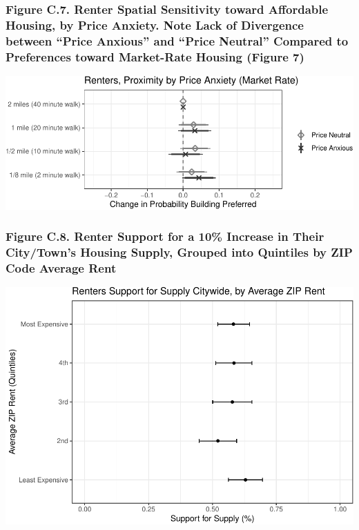 \documentclass[]{article}
\begin{document}
\hypertarget{figure-c.7.-renter-spatial-sensitivity-toward-affordable-housing-by-price-anxiety.-note-lack-of-divergence-between-price-anxious-and-price-neutral-compared-to-preferences-toward-market-rate-housing-figure-7}{%
\subsubsection{Figure C.7. Renter Spatial Sensitivity toward Affordable Housing, by Price Anxiety. Note Lack of Divergence between ``Price Anxious'' and ``Price Neutral'' Compared to Preferences toward Market-Rate Housing (Figure 7)}\label{figure-c.7.-renter-spatial-sensitivity-toward-affordable-housing-by-price-anxiety.-note-lack-of-divergence-between-price-anxious-and-price-neutral-compared-to-preferences-toward-market-rate-housing-figure-7}}

\includegraphics{Zheng-Ruth-Renters-Paper_files/figure-latex/Figure C.7 print-1.pdf}

\hypertarget{figure-c.8.-renter-support-for-a-10-increase-in-their-citytowns-housing-supply-grouped-into-quintiles-by-zip-code-average-rent}{%
\subsubsection{Figure C.8. Renter Support for a 10\% Increase in Their City/Town's Housing Supply, Grouped into Quintiles by ZIP Code Average Rent}\label{figure-c.8.-renter-support-for-a-10-increase-in-their-citytowns-housing-supply-grouped-into-quintiles-by-zip-code-average-rent}}

\includegraphics{Zheng-Ruth-Renters-Paper_files/figure-latex/Figure C.8 print-1.pdf}
\end{document}
